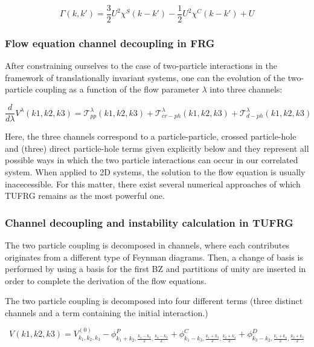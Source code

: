 \documentclass[12pt]{article}
\begin{document}
\begin{equation}
    \Gamma(k,k') = \frac{3}{2} U^2 \chi^S(k-k') -\frac{1}{2}U^2 \chi^C(k-k') + U
\end{equation}


\subsubsection{ Flow equation channel decoupling in FRG }

After constraining ourselves to the case of two-particle interactions in the framework of translationally invariant systems, one can the evolution of the two-particle coupling as a function of the flow parameter $\lambda$ into three channels:

\begin{equation}\label{3 channels}
    \frac{d}{d\lambda} V^{\lambda}(k1, k2, k3) = \mathcal{T}_{pp}^{\lambda}(k1,k2,k3) + \mathcal{T}_{cr-ph}^{\lambda}(k1,k2,k3) +\mathcal{T}_{d-ph}^{\lambda}(k1,k2,k3)
\end{equation}

Here, the three channels correspond to a particle-particle, crossed particle-hole and (three) direct particle-hole terms given explicitly below and they represent all possible ways in which the two particle interactions can occur in our correlated system. When applied to 2D systems, the solution to the flow equation is usually inacecessible. For this matter, there exist several numerical approaches of which TUFRG remains as the most powerful one.


\subsubsection{ Channel decoupling and instability calculation in TUFRG}

The two particle coupling is decomposed in channels, where each contributes originates from a different type of Feynman diagrams. Then, a change of basis is performed by using a basis for the first BZ and partitions of unity are inserted in order to complete the derivation of the flow equations.

The two particle coupling is decomposed into four different terms (three distinct channels and a term containing the initial interaction.)

\begin{equation} \label{V decoupling}
    V(k1,k2,k3)= V_{k_1, k_2, k_3}^{(0)} - \phi^{P}_{k_1 +k_2, \frac{k_1 - k_2}{2}, \frac{k_4-k_3}{2}} + \phi^{C}_{k_1 - k_3, \frac{k_1 +k_3}{2}, \frac{k_2+k_4}{2}} +\phi^{D}_{k_3- k_2, \frac{k_1 + k_4}{2}, \frac{k_2+k_3}{2}}
\end{equation}
\end{document}
